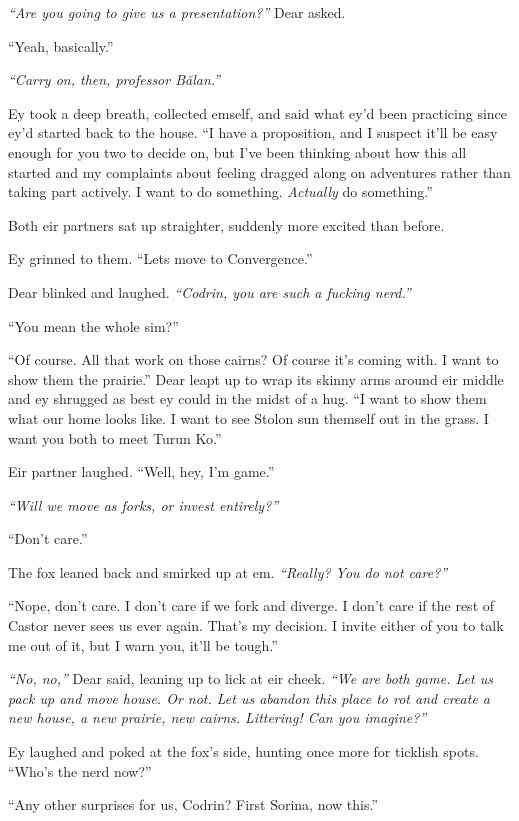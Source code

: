 \emph{``Are you going to give us a presentation?''} Dear asked.

``Yeah, basically.''

\emph{``Carry on, then, professor Bălan.''}

Ey took a deep breath, collected emself, and said what ey'd been practicing since ey'd started back to the house. ``I have a proposition, and I suspect it'll be easy enough for you two to decide on, but I've been thinking about how this all started and my complaints about feeling dragged along on adventures rather than taking part actively. I want to do something. \emph{Actually} do something.''

Both eir partners sat up straighter, suddenly more excited than before.

Ey grinned to them. ``Lets move to Convergence.''

Dear blinked and laughed. \emph{``Codrin, you are such a fucking nerd.''}

``You mean the whole sim?''

``Of course. All that work on those cairns? Of course it's coming with. I want to show them the prairie.'' Dear leapt up to wrap its skinny arms around eir middle and ey shrugged as best ey could in the midst of a hug. ``I want to show them what our home looks like. I want to see Stolon sun themself out in the grass. I want you both to meet Turun Ko.''

Eir partner laughed. ``Well, hey, I'm game.''

\emph{``Will we move as forks, or invest entirely?''}

``Don't care.''

The fox leaned back and smirked up at em. \emph{``Really? You do not care?''}

``Nope, don't care. I don't care if we fork and diverge. I don't care if the rest of Castor never sees us ever again. That's my decision. I invite either of you to talk me out of it, but I warn you, it'll be tough.''

\emph{``No, no,''} Dear said, leaning up to lick at eir cheek. \emph{``We are both game. Let us pack up and move house. Or not. Let us abandon this place to rot and create a new house, a new prairie, new cairns. Littering! Can you imagine?''}

Ey laughed and poked at the fox's side, hunting once more for ticklish spots. ``Who's the nerd now?''

``Any other surprises for us, Codrin? First Sorina, now this.''

